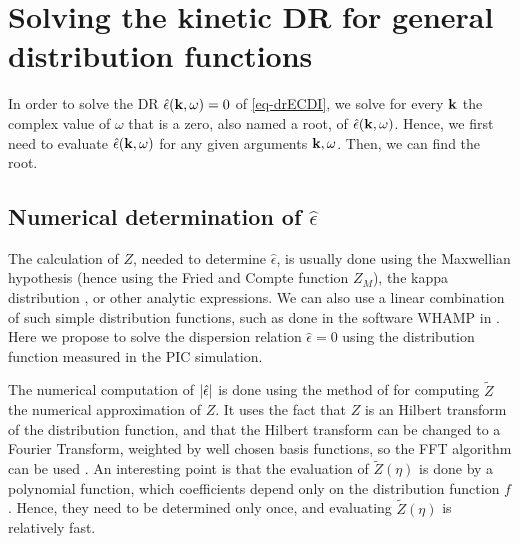 
\section{Solving the kinetic \acs{DR} for general distribution functions}
  \label{sec-DR-solver}


  In order to solve the \ac{DR}  $\hat\epsilon({\mathbf k}, \omega) = 0$ of \cref{eq-drECDI}, we solve for every ${\mathbf k}$ the complex value of $\omega$ that is a zero, also named a root, of $\hat\epsilon({\mathbf k}, \omega)$.
  Hence, we first need to evaluate $\hat\epsilon({\mathbf k}, \omega)$ for any given arguments ${\mathbf k}, \omega$.
  Then, we can find the root.
  

  \subsection{Numerical determination of \texorpdfstring{$\hat\epsilon$}{the plasma dielectric function.}} \label{subsec-numepsilon}
  
  The calculation of $Z$, needed to determine $\hat{\epsilon}$, is usually done using the Maxwellian hypothesis \citep{cavalier2013} (hence using the Fried and Compte function $Z_M$), the kappa distribution \citep{ziebell2017}, or other analytic expressions.
  We can also use a linear combination of such simple distribution functions, such as done in the software WHAMP in \citet{ronnmark1982}.
  Here we propose to solve the dispersion relation $\hat{\epsilon}=0$ using the distribution function measured in the \ac{PIC} simulation.
  
  The numerical computation of $\lvert\hat\epsilon\rvert$ is done using the method of \citet{xie2013} for computing $\tilde{Z}$ the numerical approximation of $Z$. 
  It uses the fact that $Z$ is an Hilbert transform of the distribution function, and that the Hilbert transform can be changed to a Fourier Transform, weighted by well chosen basis functions, so the \ac{FFT} algorithm can be used \citep{weideman1995}.
  An interesting point is that the evaluation of $\tilde{Z}(\eta)$ is done by a polynomial function, which coefficients depend only on the distribution function $f$. 
  Hence, they need to be determined only once, and evaluating $\tilde{Z}(\eta)$ is relatively fast.
  
